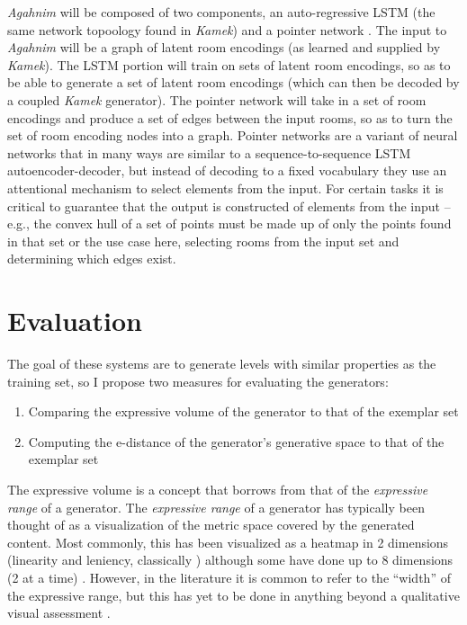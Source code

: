 \documentclass[12pt]{report}
\begin{document}
\textit{Agahnim} will be composed of two components, an auto-regressive LSTM (the same network topoology found in \textit{Kamek}) and a pointer network \cite{pointer_network}.  The input to \textit{Agahnim} will be a graph of latent room encodings (as learned and supplied by \textit{Kamek}).  The LSTM portion will train on sets of latent room encodings, so as to be able to generate a set of latent room encodings (which can then be decoded by a coupled \textit{Kamek} generator).  The pointer network will take in a set of room encodings and produce a set of edges between the input rooms, so as to turn the set of room encoding nodes into a graph.   Pointer networks are a variant of neural networks that in many ways are similar to a sequence-to-sequence LSTM autoencoder-decoder, but instead of decoding to a fixed vocabulary they use an attentional mechanism to select elements from the input.  For certain tasks it is critical to guarantee that the output is constructed of elements from the input -- e.g., the convex hull of a set of points must be made up of only the points found in that set or the use case here, selecting rooms from the input set and determining which edges exist.
  
\section*{Evaluation}

The goal of these systems are to generate levels with similar properties as the training set, so I propose two measures for evaluating the generators:

\begin{enumerate}
\item Comparing the expressive volume of the generator to that of the exemplar set
\item Computing the e-distance of the generator's generative space to that of the exemplar set
\end{enumerate}

The expressive volume is a concept that borrows from that of the \textit{expressive range} of a generator. The \textit{expressive range} \cite{smith2010analyzing} of a generator has typically been thought of as a visualization of the metric space covered by the generated content.  Most commonly, this has been visualized as a heatmap in 2 dimensions (linearity and leniency, classically \cite{van2013designing,snodgrass2015hierarchical}) although some have done up to 8 dimensions (2 at a time) \cite{summerville2016mariostring}.  However, in the literature it is common to refer to the ``width'' of the expressive range, but this has yet to be done in anything beyond a qualitative visual assessment \cite{smith2011launchpad}.  
\end{document}
